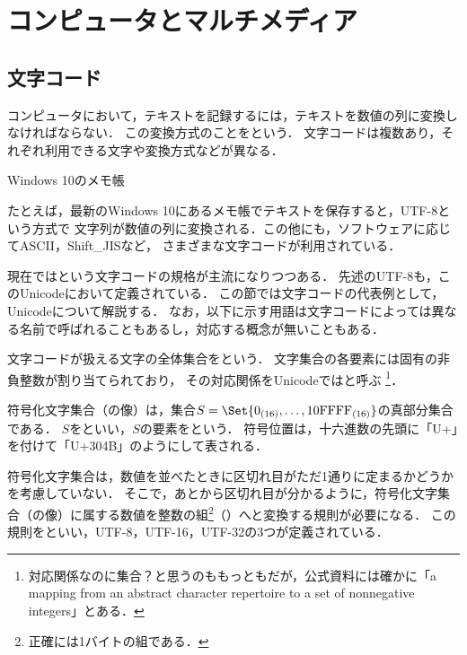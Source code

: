 \documentclass[../../index]{subfiles}
\begin{document}
\chapter{コンピュータとマルチメディア}
\section{文字コード}
コンピュータにおいて，テキストを記録するには，テキストを数値の列に変換しなければならない．
この変換方式のことをという．
文字コードは複数あり，それぞれ利用できる文字や変換方式などが異なる．

\begin{floatingfigure}{\smallfiguresize}
  \centering
  \caption{Windows 10のメモ帳}
\end{floatingfigure}

たとえば，最新のWindows 10にあるメモ帳でテキストを保存すると，UTF-8という方式で
文字列が数値の列に変換される．この他にも，ソフトウェアに応じてASCII，Shift\_JISなど，
さまざまな文字コードが利用されている．

現在ではという文字コードの規格が主流になりつつある．
先述のUTF-8も，このUnicodeにおいて定義されている．
この節では文字コードの代表例として，Unicodeについて解説する．
なお，以下に示す用語は文字コードによっては異なる名前で呼ばれることもあるし，対応する概念が無いこともある．

文字コードが扱える文字の全体集合をという．
文字集合の各要素には固有の非負整数が割り当てられており，
その対応関係をUnicodeではと呼ぶ
\footnote{対応関係なのに集合？と思うのももっともだが，公式資料には確かに「a mapping from an abstract character repertoire to a set of nonnegative integers」\cite{Whistler2008}とある．}．

符号化文字集合（の像）は，集合\(S=\Set{0_{(16)},\dots,\literal{10FFFF}_{(16)}}\)の真部分集合である．
\(S\)をといい，\(S\)の要素をという．
符号位置は，十六進数の先頭に「U+」を付けて「U+304B」のようにして表される．

符号化文字集合は，数値を並べたときに区切れ目がただ1通りに定まるかどうかを考慮していない．
そこで，あとから区切れ目が分かるように，符号化文字集合（の像）に属する数値を整数の組\footnote{正確には1バイトの組である．}（）へと変換する規則が必要になる．
この規則をといい，UTF-8，UTF-16，UTF-32の3つが定義されている．
\end{document}
